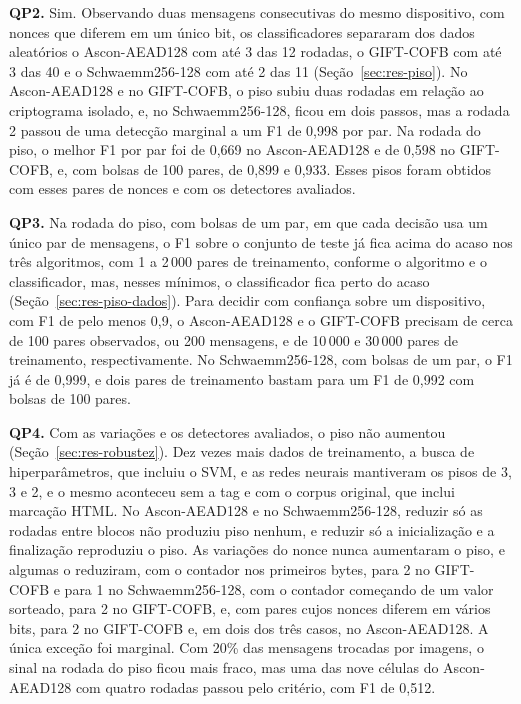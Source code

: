 \textbf{QP2.} Sim. Observando duas mensagens consecutivas do mesmo dispositivo, com nonces que diferem em um único bit, os classificadores separaram dos dados aleatórios o Ascon-AEAD128 com até 3 das 12 rodadas, o GIFT-COFB com até 3 das 40 e o Schwaemm256-128 com até 2 das 11 (Seção~\ref{sec:res-piso}). No Ascon-AEAD128 e no GIFT-COFB, o piso subiu duas rodadas em relação ao criptograma isolado, e, no Schwaemm256-128, ficou em dois passos, mas a rodada 2 passou de uma detecção marginal a um F1 de 0,998 por par. Na rodada do piso, o melhor F1 por par foi de 0,669 no Ascon-AEAD128 e de 0,598 no GIFT-COFB, e, com bolsas de 100 pares, de 0,899 e 0,933. Esses pisos foram obtidos com esses pares de nonces e com os detectores avaliados.

\textbf{QP3.} Na rodada do piso, com bolsas de um par, em que cada decisão usa um único par de mensagens, o F1 sobre o conjunto de teste já fica acima do acaso nos três algoritmos, com 1 a 2\,000 pares de treinamento, conforme o algoritmo e o classificador, mas, nesses mínimos, o classificador fica perto do acaso (Seção~\ref{sec:res-piso-dados}). Para decidir com confiança sobre um dispositivo, com F1 de pelo menos 0,9, o Ascon-AEAD128 e o GIFT-COFB precisam de cerca de 100 pares observados, ou 200 mensagens, e de 10\,000 e 30\,000 pares de treinamento, respectivamente. No Schwaemm256-128, com bolsas de um par, o F1 já é de 0,999, e dois pares de treinamento bastam para um F1 de 0,992 com bolsas de 100 pares.

\textbf{QP4.} Com as variações e os detectores avaliados, o piso não aumentou (Seção~\ref{sec:res-robustez}). Dez vezes mais dados de treinamento, a busca de hiperparâmetros, que incluiu o SVM, e as redes neurais mantiveram os pisos de 3, 3 e 2, e o mesmo aconteceu sem a tag e com o corpus original, que inclui marcação HTML. No Ascon-AEAD128 e no Schwaemm256-128, reduzir só as rodadas entre blocos não produziu piso nenhum, e reduzir só a inicialização e a finalização reproduziu o piso. As variações do nonce nunca aumentaram o piso, e algumas o reduziram, com o contador nos primeiros bytes, para 2 no GIFT-COFB e para 1 no Schwaemm256-128, com o contador começando de um valor sorteado, para 2 no GIFT-COFB, e, com pares cujos nonces diferem em vários bits, para 2 no GIFT-COFB e, em dois dos três casos, no Ascon-AEAD128. A única exceção foi marginal. Com 20\% das mensagens trocadas por imagens, o sinal na rodada do piso ficou mais fraco, mas uma das nove células do Ascon-AEAD128 com quatro rodadas passou pelo critério, com F1 de 0,512.

